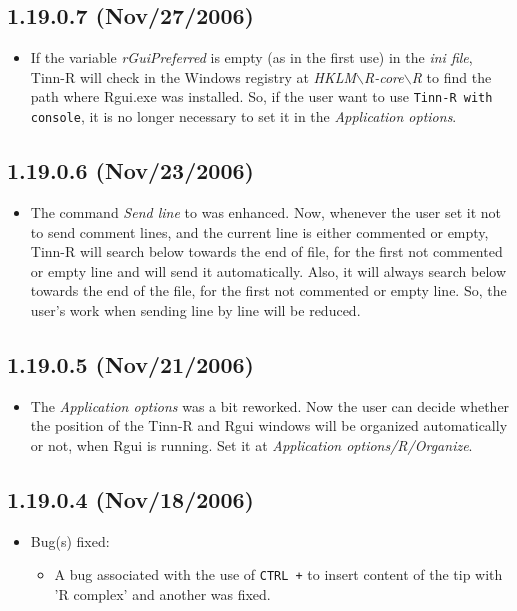 \subsection*{1.19.0.7 (Nov/27/2006)}
\begin{itemize}
  \item If the variable \textit{rGuiPreferred} is empty (as in the first use)
    in the \textit{ini file}, Tinn-R will check in the Windows registry at
    \textit{HKLM$\backslash$R-core$\backslash$R} to find the path where
    Rgui.exe was installed. So, if the user want to use \texttt{Tinn-R with
      \RR{} console}, it is no longer necessary to set it in the
    \textit{Application options}.
\end{itemize}


\subsection*{1.19.0.6 (Nov/23/2006)}
\begin{itemize}
  \item The command \textit{Send line} to \RR{} was enhanced. Now, whenever
    the user set it not to send comment lines, and the current line is either
    commented or empty, Tinn-R will search below towards the end of file, for
    the first not commented or empty line and will send it automatically.
    Also, it will always search below towards the end of the file, for the first
    not commented or empty line. So, the user's work when
    sending line by line will be reduced.
\end{itemize}


\subsection*{1.19.0.5 (Nov/21/2006)}
\begin{itemize}
  \item The \textit{Application options} was a bit reworked. Now the user can
    decide whether the position of the Tinn-R and Rgui windows will be organized
    automatically or not, when Rgui is running. Set it at \textit{Application
      options/R/Organize}.
\end{itemize}


\subsection*{1.19.0.4 (Nov/18/2006)}
\begin{itemize}
  \item Bug(s) fixed:
    \begin{itemize}
      \item A bug associated with the use of \texttt{CTRL +} to insert content of
        the tip with 'R complex' and another was fixed.
    \end{itemize}
\end{itemize}


